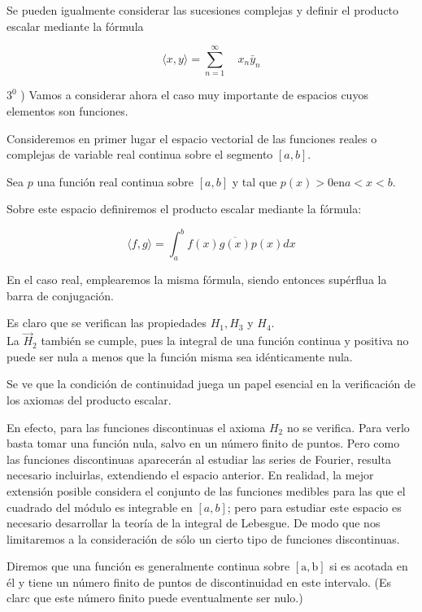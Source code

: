 \documentclass[10pt]{article}
\theoremstyle{plain}
\theoremstyle{definition}
\theoremstyle{remark}
\begin{document}
Se pueden igualmente considerar las sucesiones complejas y definir el producto escalar mediante la fórmula

$$
\langle x, y\rangle=\sum_{n=1}^{\infty} \quad x_{n} \bar{y}_{n}
$$

$3^{0}$ ) Vamos a considerar ahora el caso muy importante de espacios cuyos elementos son funciones.


Consideremos en primer lugar el espacio vectorial de las funciones reales o complejas de variable real continua sobre el segmento $[a, b]$.

Sea $p$ una función real continua sobre $[a, b]$ y tal que $p(x)>0 \mathrm{en} a<x<b$.

Sobre este espacio definiremos el producto escalar mediante la fórmula:


\begin{equation*}
\langle f, g\rangle=\int_{a}^{b} f(x) \overline{g(x)} p(x) d x \tag{$3\cdot13$}
\end{equation*}


En el caso real, emplearemos la misma fórmula, siendo entonces supérflua la barra de conjugación.

Es claro que se verifican las propiedades $H_{1}, H_{3}$ y $H_{4}$.\\
La $\vec{H}_{2}$ también se cumple, pues la integral de una función continua y positiva no puede ser nula a menos que la función misma sea idénticamente nula.

Se ve que la condición de continuidad juega un papel esencial en la verificación de los axiomas del producto escalar.

En efecto, para las funciones discontinuas el axioma $H_{2}$ no se verifica. Para verlo basta tomar una función nula, salvo en un número finito de puntos. Pero como las funciones discontinuas aparecerán al estudiar las series de Fourier, resulta necesario incluirlas, extendiendo el espacio anterior. En realidad, la mejor extensión posible considera el conjunto de las funciones medibles para las que el cuadrado del módulo es integrable en $[a, b]$; pero para estudiar este espacio es necesario desarrollar la teoría de la integral de Lebesgue. De modo que nos limitaremos a la consideración de sólo un cierto tipo de funciones discontinuas.

Diremos que una función es generalmente continua sobre $[\mathrm{a}, \mathrm{b}]$ si es acotada en él y tiene un número finito de puntos de discontinuidad en este intervalo. (Es clarc que este número finito puede eventualmente ser nulo.)
\end{document}
